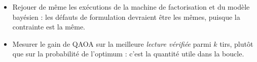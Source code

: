 \begin{pistes}
\begin{itemize}
\item Rejouer de même les exécutions de la machine de factorisation et du modèle bayésien : les défauts de formulation devraient être les mêmes, puisque la contrainte est la même.
\item Mesurer le gain de QAOA sur la meilleure \emph{lecture vérifiée} parmi $k$ tirs, plutôt que sur la probabilité de l'optimum : c'est la quantité utile dans la boucle.
\end{itemize}
\end{pistes}
